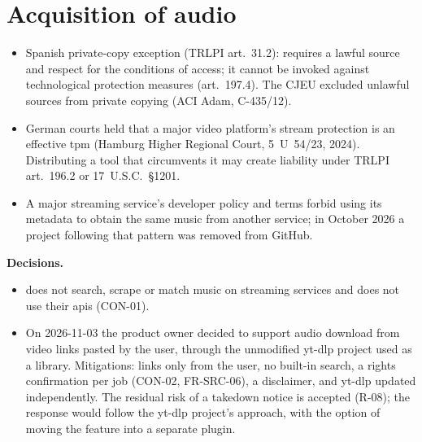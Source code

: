 \documentclass{covermaker}
\begin{document}
\section{Acquisition of audio}
\begin{itemize}
  \item Spanish private-copy exception (TRLPI art.~31.2): requires a lawful source
        and respect for the conditions of access; it cannot be invoked against
        technological protection measures (art.~197.4). The CJEU excluded
        unlawful sources from private copying (ACI Adam, C-435/12).
  \item German courts held that a major video platform's stream protection is an
        effective \gls{tpm} (Hamburg Higher Regional Court, 5~U~54/23, 2024).
        Distributing a tool that circumvents it may create liability under
        TRLPI art.~196.2 or 17~U.S.C.~\S1201.
  \item A major streaming service's developer policy and terms forbid using its
        metadata to obtain the same music from another service; in October 2026
        a project following that pattern was removed from GitHub.
\end{itemize}
\textbf{Decisions.}
\begin{itemize}
  \item \CM{} does not search, scrape or match music on streaming services and
        does not use their \glspl{api} (CON-01).
  \item On 2026-11-03 the product owner decided to support audio download from
        video links pasted by the user, through the unmodified yt-dlp project
        used as a library. Mitigations: links only from the user, no built-in
        search, a rights confirmation per job (CON-02, FR-SRC-06), a
        disclaimer, and yt-dlp updated independently. The residual risk of a
        takedown notice is accepted (R-08); the response would follow the
        yt-dlp project's approach, with the option of moving the feature into
        a separate plugin.
\end{itemize}
\end{document}
